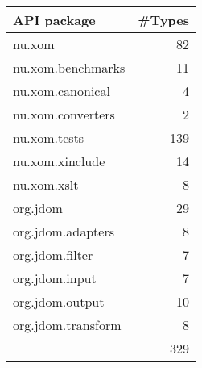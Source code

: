\begin{tabular}{|l|r|}\hline
API package & \#Types \\\hline\hline
nu.xom & 82\\\hline
nu.xom.benchmarks & 11\\\hline
nu.xom.canonical & 4\\\hline
nu.xom.converters & 2\\\hline
nu.xom.tests & 139\\\hline
nu.xom.xinclude & 14\\\hline
nu.xom.xslt & 8\\\hline
org.jdom & 29\\\hline
org.jdom.adapters & 8\\\hline
org.jdom.filter & 7\\\hline
org.jdom.input & 7\\\hline
org.jdom.output & 10\\\hline
org.jdom.transform & 8\\\hline
\hline
 & 329\\\hline
\end{tabular}
